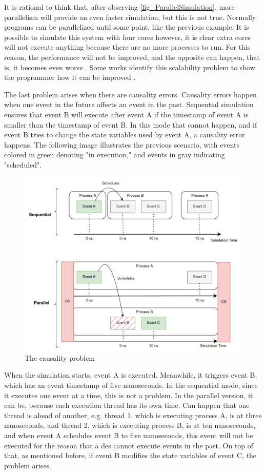It is rational to think that, after observing \autoref{fig_ParallelSimulation}, more parallelism will provide an even faster simulation, but 
this is not true. Normally programs can be parallelized until some point, like the previous example.
It is possible to simulate this system with four 
cores however, it is clear extra cores will not execute anything because there are no more processes to run. For this reason, 
the performance will not be improved, and the opposite can happen, that is, it becomes even worse \cite{scabilityIssue}. Some works identify 
this scalability problem to show the programmer how it can be improved \cite{scalabilityProblem} \cite{scalabilityProblem2}.

The last problem arises when there are causality errors. Causality errors happen when one event in the future affects an event in the past. 
Sequential simulation ensures that event B will execute after event A if the timestamp of event A is smaller than the timestamp of event B. 
In this mode that cannot happen, and if event B tries to change the state variables used by event A, a causality error happens. The following image 
illustrates the previous scenario, with events colored in green denoting "in execution," and events in gray indicating "scheduled".

\begin{figure}[H]
	\centering
 	\includegraphics[width=0.85\linewidth]{Images/CausalityError.png}
 	\caption{The causality problem}
	 \label{fig_causalityError}
\end{figure}

When the simulation starts, event A is executed. Meanwhile, it triggers event B, which has an event timestamp of five nanoseconds. In the 
sequential mode, since it executes one event at a time, this is not a problem. In the parallel version, it can be, because each execution 
thread has its own time. Can happen that one thread is ahead of another, e.g. thread 1, which is executing process A, is at three nanoseconds, 
and thread 2, which is executing process B, is at ten nanoseconds, and when event A schedules event B to five nanoseconds, this event will 
not be executed for the reason that a \gls{des} cannot execute events in the past. On top of that, as mentioned before, if event B modifies 
the state variables of event C, the problem arises. 

